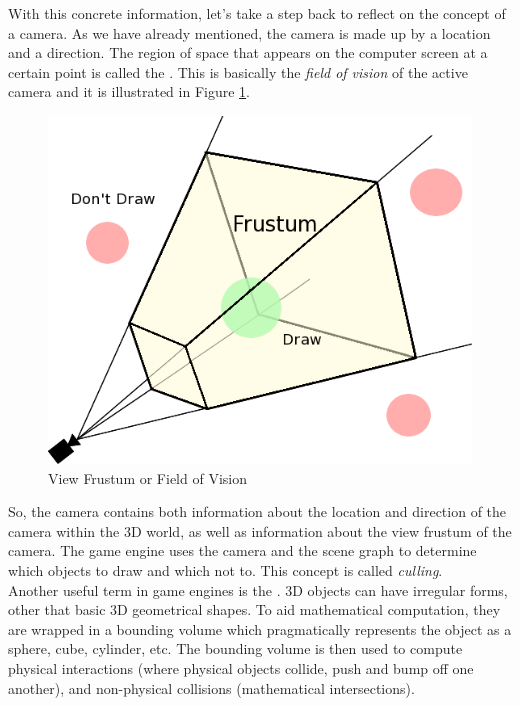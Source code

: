 With this concrete information, let's take a step back to reflect on the concept of a camera. As we have already mentioned, the camera is made up by a location and a direction. The region of space that appears on the computer screen at a certain point is called the \emph{}. This is basically the \emph{field of vision} of the active camera and it is illustrated in Figure \ref{fig:view_frustum}.\\
\begin{figure}[H]
	\centering
	\includegraphics[width=\linewidth]{gfx/Chapter3/view_frustum}
	\caption{View Frustum or Field of Vision}
	\label{fig:view_frustum}
\end{figure}

So, the camera contains both information about the location and direction of the camera within the 3D world, as well as information about the view frustum of the camera. The game engine uses the camera and the scene graph to determine which objects to draw and which not to. This concept is called \emph{culling}.\\

Another useful term in game engines is the \emph{}. 3D objects can have irregular forms, other that basic 3D geometrical shapes. To aid mathematical computation, they are wrapped in a bounding volume which pragmatically represents the object as a sphere, cube, cylinder, etc. The bounding volume is then used to compute physical interactions (where physical objects collide, push and bump off one another), and non-physical collisions (mathematical intersections).\\

